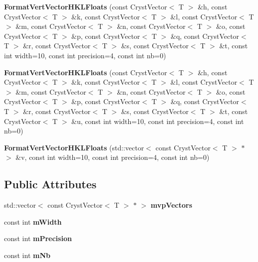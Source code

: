 \begin{DoxyCompactItemize}
{\bfseries Format\+Vert\+Vector\+H\+K\+L\+Floats} (const Cryst\+Vector$<$ T $>$ \&h, const Cryst\+Vector$<$ T $>$ \&k, const Cryst\+Vector$<$ T $>$ \&l, const Cryst\+Vector$<$ T $>$ \&m, const Cryst\+Vector$<$ T $>$ \&n, const Cryst\+Vector$<$ T $>$ \&o, const Cryst\+Vector$<$ T $>$ \&p, const Cryst\+Vector$<$ T $>$ \&q, const Cryst\+Vector$<$ T $>$ \&r, const Cryst\+Vector$<$ T $>$ \&s, const Cryst\+Vector$<$ T $>$ \&t, const int width=10, const int precision=4, const int nb=0)
\item 
\mbox{\label{class_format_vert_vector_h_k_l_floats_a18b6d3dc5f518e72b262c4b566037752}} 
{\bfseries Format\+Vert\+Vector\+H\+K\+L\+Floats} (const Cryst\+Vector$<$ T $>$ \&h, const Cryst\+Vector$<$ T $>$ \&k, const Cryst\+Vector$<$ T $>$ \&l, const Cryst\+Vector$<$ T $>$ \&m, const Cryst\+Vector$<$ T $>$ \&n, const Cryst\+Vector$<$ T $>$ \&o, const Cryst\+Vector$<$ T $>$ \&p, const Cryst\+Vector$<$ T $>$ \&q, const Cryst\+Vector$<$ T $>$ \&r, const Cryst\+Vector$<$ T $>$ \&s, const Cryst\+Vector$<$ T $>$ \&t, const Cryst\+Vector$<$ T $>$ \&u, const int width=10, const int precision=4, const int nb=0)
\item 
\mbox{\label{class_format_vert_vector_h_k_l_floats_a10f6a2bd1b3616b8af9e74e1b41a007f}} 
{\bfseries Format\+Vert\+Vector\+H\+K\+L\+Floats} (std\+::vector$<$ const Cryst\+Vector$<$ T $>$ $\ast$ $>$ \&v, const int width=10, const int precision=4, const int nb=0)
\end{DoxyCompactItemize}
\subsection*{Public Attributes}
\begin{DoxyCompactItemize}
\item 
\mbox{\label{class_format_vert_vector_h_k_l_floats_adf1d4ac745168890122eb8258a15d2c7}} 
std\+::vector$<$ const Cryst\+Vector$<$ T $>$ $\ast$ $>$ {\bfseries mvp\+Vectors}
\item 
\mbox{\label{class_format_vert_vector_h_k_l_floats_a47d65c09249a2efaacfc37c490f25115}} 
const int {\bfseries m\+Width}
\item 
\mbox{\label{class_format_vert_vector_h_k_l_floats_a82aa77621492dcd761a755c9d707cb9e}} 
const int {\bfseries m\+Precision}
\item 
\mbox{\label{class_format_vert_vector_h_k_l_floats_a9a37ff9bdd4f1428e339d4a2e3080bdb}} 
const int {\bfseries m\+Nb}
\end{DoxyCompactItemize}


